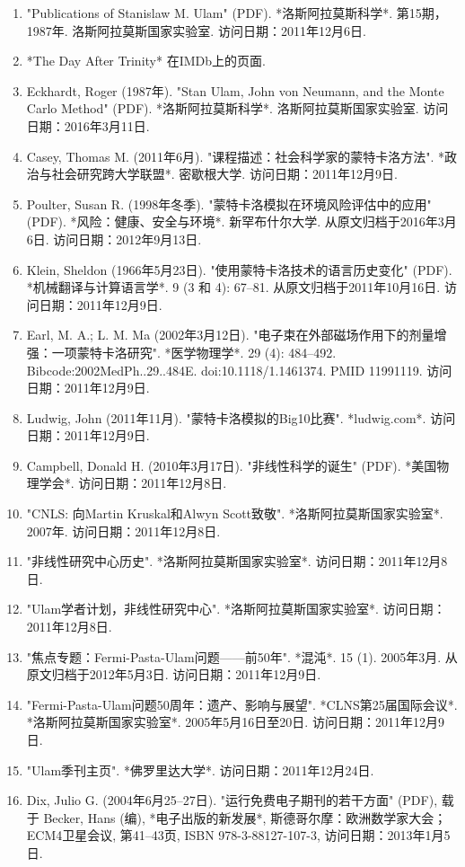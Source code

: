 \begin{enumerate}
\item "Publications of Stanislaw M. Ulam" (PDF). *洛斯阿拉莫斯科学*. 第15期，1987年. 洛斯阿拉莫斯国家实验室. 访问日期：2011年12月6日.
\item *The Day After Trinity* 在IMDb上的页面.
\item Eckhardt, Roger (1987年). "Stan Ulam, John von Neumann, and the Monte Carlo Method" (PDF). *洛斯阿拉莫斯科学*. 洛斯阿拉莫斯国家实验室. 访问日期：2016年3月11日.
\item Casey, Thomas M. (2011年6月). "课程描述：社会科学家的蒙特卡洛方法". *政治与社会研究跨大学联盟*. 密歇根大学. 访问日期：2011年12月9日.
\item Poulter, Susan R. (1998年冬季). "蒙特卡洛模拟在环境风险评估中的应用" (PDF). *风险：健康、安全与环境*. 新罕布什尔大学. 从原文归档于2016年3月6日. 访问日期：2012年9月13日.
\item Klein, Sheldon (1966年5月23日). "使用蒙特卡洛技术的语言历史变化" (PDF). *机械翻译与计算语言学*. 9 (3 和 4): 67–81. 从原文归档于2011年10月16日. 访问日期：2011年12月9日.
\item Earl, M. A.; L. M. Ma (2002年3月12日). "电子束在外部磁场作用下的剂量增强：一项蒙特卡洛研究". *医学物理学*. 29 (4): 484–492. Bibcode:2002MedPh..29..484E. doi:10.1118/1.1461374. PMID 11991119. 访问日期：2011年12月9日.
\item Ludwig, John (2011年11月). "蒙特卡洛模拟的Big10比赛". *ludwig.com*. 访问日期：2011年12月9日.
\item Campbell, Donald H. (2010年3月17日). "非线性科学的诞生" (PDF). *美国物理学会*. 访问日期：2011年12月8日.
\item "CNLS: 向Martin Kruskal和Alwyn Scott致敬". *洛斯阿拉莫斯国家实验室*. 2007年. 访问日期：2011年12月8日.
\item "非线性研究中心历史". *洛斯阿拉莫斯国家实验室*. 访问日期：2011年12月8日.
\item "Ulam学者计划，非线性研究中心". *洛斯阿拉莫斯国家实验室*. 访问日期：2011年12月8日.
\item "焦点专题：Fermi-Pasta-Ulam问题——前50年". *混沌*. 15 (1). 2005年3月. 从原文归档于2012年5月3日. 访问日期：2011年12月9日.
\item "Fermi-Pasta-Ulam问题50周年：遗产、影响与展望". *CLNS第25届国际会议*. *洛斯阿拉莫斯国家实验室*. 2005年5月16日至20日. 访问日期：2011年12月9日.
\item "Ulam季刊主页". *佛罗里达大学*. 访问日期：2011年12月24日.
\item Dix, Julio G. (2004年6月25–27日). "运行免费电子期刊的若干方面" (PDF), 载于 Becker, Hans (编), *电子出版的新发展*, 斯德哥尔摩：欧洲数学家大会；ECM4卫星会议, 第41–43页, ISBN 978-3-88127-107-3, 访问日期：2013年1月5日.

\end{enumerate}
